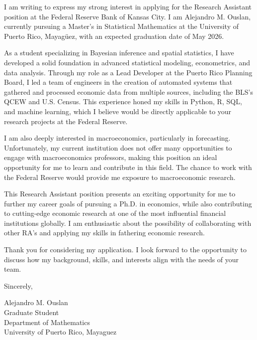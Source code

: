 \documentclass{article}
\begin{document}
I am writing to express my strong interest in applying for the Research Assistant position at the Federal Reserve Bank of Kansas City.
I am Alejandro M. Ouslan, currently pursuing a Master’s in Statistical Mathematics at the University of Puerto Rico, Mayagüez, with an expected graduation date of May 2026.

As a student specializing in Bayesian inference and spatial statistics, I have developed a solid foundation in advanced statistical modeling, econometrics, and data analysis.
Through my role as a Lead Developer at the Puerto Rico Planning Board, I led a team of engineers in the creation of automated systems that gathered and processed economic data
from multiple sources, including the BLS’s QCEW and U.S. Census. This experience honed my skills in Python, R, SQL, and machine learning, which I believe would be directly
applicable to your research projects at the Federal Reserve.

I am also deeply interested in macroeconomics, particularly in forecasting. Unfortunately, my current institution does not offer many opportunities to engage with macroeconomics professors,
making this position an ideal opportunity for me to learn and contribute in this field. The chance to work with the Federal Reserve would provide me exposure to macroeconomic
research.

This Research Assistant position presents an exciting opportunity for me to further my career goals of pursuing a Ph.D. in economics, while also contributing to
cutting-edge economic research at one of the most influential financial institutions globally. I am enthusiastic about the possibility of collaborating with
other RA's and applying my skills in fathering economic research.

Thank you for considering my application. I look forward to the opportunity to discuss how my background, skills, and interests align with the needs of your team.

Sincerely,  
\vspace{20pt}  

Alejandro M. Ouslan \\
Graduate Student \\
Department of Mathematics \\
University of Puerto Rico, Mayaguez
\end{document}
